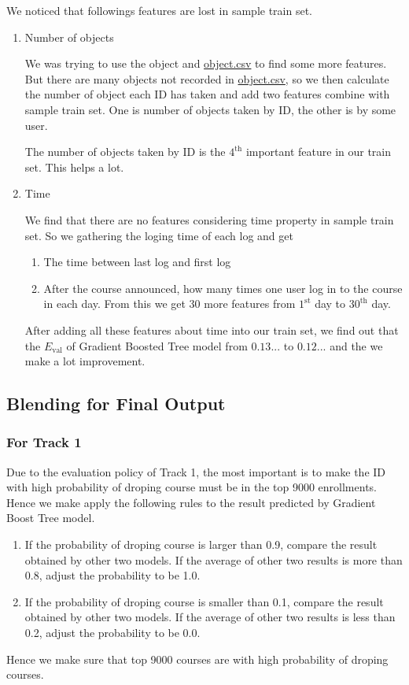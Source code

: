 \documentclass[12pt]{article}
\begin{document}
We noticed that followings features are lost in sample train set.
\begin{enumerate}
	\item Number of objects
	
	We was trying to use the object and \url{object.csv} to find some more features. But there are many objects not recorded in \url{object.csv}, so we then calculate the number of object each ID has taken and add two features combine with sample train set. One is number of objects taken by ID, the other is by some user.
	
	The number of objects taken by ID is the $4^{\text{th}}$ important feature in our train set. This helps a lot.
	\item Time
	
	We find that there are no features considering time property in sample train set. So we gathering the loging time of each log and get
	\begin{enumerate}
		\item The time between last log and first log
		\item After the course announced, how many times one user log in to the course in each day. From this we get 30 more features from $1^{\text{st}}$ day to ${30}^{\text{th}}$ day.
	\end{enumerate}
	After adding all these features about time into our train set, we find out that the $E_{\text{val}}$ of Gradient Boosted Tree model from $0.13...$ to $0.12...$ and the we make a lot improvement.
\end{enumerate}

\subsection{Blending for Final Output}

\subsubsection{For Track 1}

Due to the evaluation policy of Track 1, the most important is to make the ID with high probability of droping course must be in the top 9000 enrollments. Hence we make apply the following rules to the result predicted by Gradient Boost Tree model.
\begin{enumerate}
	\item If the probability of droping course is larger than 0.9, compare the result obtained by other two models. If the average of other two results is more than 0.8, adjust the probability to be 1.0.
	\item If the probability of droping course is smaller than 0.1, compare the result obtained by other two models. If the average of other two results is less than 0.2, adjust the probability to be 0.0.
\end{enumerate}
Hence we make sure that top 9000 courses are with high probability of droping courses.
\end{document}
